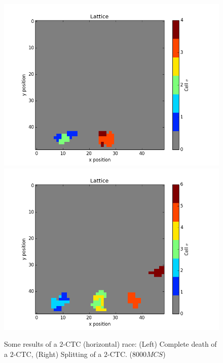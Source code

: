 \documentclass[12pt]{article}
\begin{document}
\begin{figure}[h]
	\centering
	\includegraphics[scale=0.40]{img/2CTCh-dead}
	\includegraphics[scale=0.40]{img/2CTCh-split}
	\caption{Some results of a $2$-CTC (horizontal) race: (Left) Complete death of a $2$-CTC, (Right) Splitting of a $2$-CTC. ($8000MCS$)}
	\label{2CTC-vert}
\end{figure}
\end{document}
